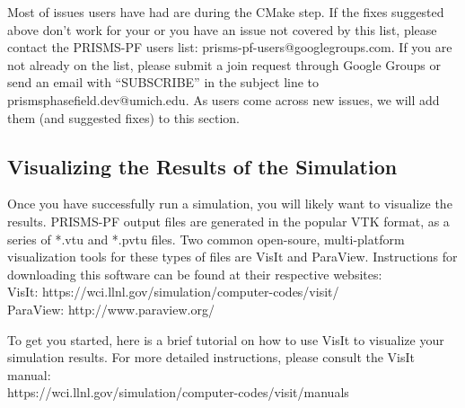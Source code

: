 \documentclass[10pt]{article} %
\begin{document}
Most of issues users have had are during the CMake step. If the fixes suggested above don't work for your or you have an issue not covered by this list, please contact the PRISMS-PF users list: prisms-pf-users@googlegroups.com. If you are not already on the list, please submit a join request through Google Groups or send an email with ``SUBSCRIBE'' in the subject line to prismsphasefield.dev@umich.edu. As users come across new issues, we will add them (and suggested fixes) to this section.

\subsection{Visualizing the Results of the Simulation}
Once you have successfully run a simulation, you will likely want to visualize the results.  PRISMS-PF output files are generated in the popular VTK format, as a series of *.vtu and *.pvtu files. Two common open-soure, multi-platform visualization tools for these types of files are VisIt and ParaView. Instructions for downloading this software can be found at their respective websites:
\\VisIt: https://wci.llnl.gov/simulation/computer-codes/visit/
\\ParaView: http://www.paraview.org/

To get you started, here is a brief tutorial on how to use VisIt to visualize your simulation results. For more detailed instructions, please consult the VisIt manual:
\\ https://wci.llnl.gov/simulation/computer-codes/visit/manuals
\end{document}
